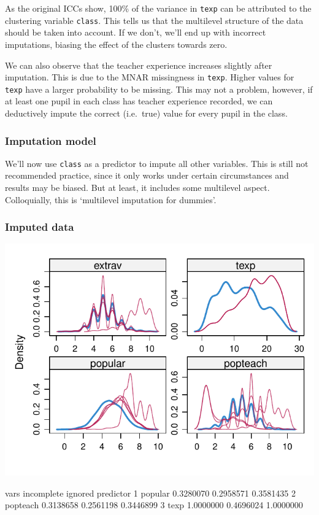 \documentclass[
]{jss}
\begin{document}
As the original ICCs show, 100\% of the variance in \texttt{texp} can be
attributed to the clustering variable \texttt{class}. This tells us that
the multilevel structure of the data should be taken into account. If we
don't, we'll end up with incorrect imputations, biasing the effect of
the clusters towards zero.

We can also observe that the teacher experience increases slightly after
imputation. This is due to the MNAR missingness in \texttt{texp}. Higher
values for \texttt{texp} have a larger probability to be missing. This
may not a problem, however, if at least one pupil in each class has
teacher experience recorded, we can deductively impute the correct
(i.e.~true) value for every pupil in the class.

\hypertarget{imputation-model-1}{%
\subsubsection{Imputation model}\label{imputation-model-1}}

We'll now use \texttt{class} as a predictor to impute all other
variables. This is still not recommended practice, since it only works
under certain circumstances and results may be biased. But at least, it
includes some multilevel aspect. Colloquially, this is `multilevel
imputation for dummies'.

\hypertarget{imputed-data-1}{%
\subsubsection{Imputed data}\label{imputed-data-1}}

\begin{CodeChunk}


\begin{center}\includegraphics{Manuscript_files/figure-latex/pop_predictor_eval-1} \end{center}

\begin{CodeOutput}
      vars incomplete   ignored predictor
1  popular  0.3280070 0.2958571 0.3581435
2 popteach  0.3138658 0.2561198 0.3446899
3     texp  1.0000000 0.4696024 1.0000000
\end{CodeOutput}
\end{CodeChunk}
\end{document}
